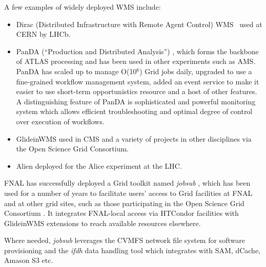 \noindent
A few examples of widely deployed WMS include:
\begin{itemize}

\item Dirac (Distributed Infrastructure with Remote Agent Control) WMS~\cite{dirac_wms} used at CERN by LHCb.

\item PanDA (``Production and Distributed Analysis'') \cite{panda_chep13}, which forms the backbone of ATLAS processing and has been used in other experiments such as AMS.
PanDA has scaled up to manage O(10$^6$) Grid jobs daily, upgraded to use a fine-grained workflow management system, added an event service to
make it easier to use short-term opportunistics resource and a host of other features. A distinguishing feature of PanDA is sophisticated and powerful
monitoring system which allows efficient troubleshooting and optimal degree of control over execution of workflows.

\item GlideinWMS \cite{glideinwms_chep13} used in CMS and a variety of projects in other disciplines via the Open Science Grid Consortium.

\item Alien \cite{alien} deployed for the Alice experiment at the LHC.

\end{itemize}

\noindent
FNAL has successfully deployed a Grid toolkit named \textit{jobsub} \cite{jobsub_chep13}, which has been used for a number of years to facilitate users' access to
Grid facilities at FNAL and at other grid sites, such as those participating in the Open Science Grid Consortium \cite{osg}. It integrates FNAL-local access via
HTCondor facilities with GlideinWMS extensions to reach available resources elsewhere.

Where needed, \textit{jobsub} leverages the CVMFS network file system for software provisioning and the \textit{ifdh} data handling tool which integrates
with SAM, dCache, Amason S3 etc.
